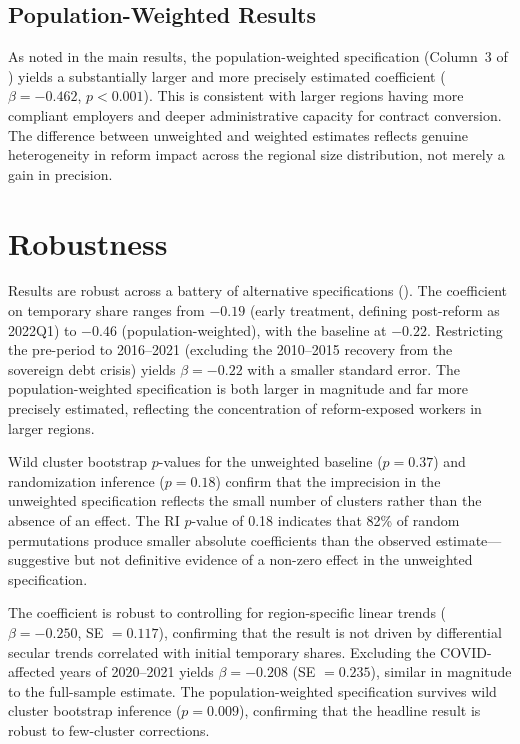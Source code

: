 \documentclass[12pt]{article}
\begin{document}
\subsection{Population-Weighted Results}

As noted in the main results, the population-weighted specification (Column~3 of ) yields a substantially larger and more precisely estimated coefficient ($\beta = -0.462$, $p < 0.001$). This is consistent with larger regions having more compliant employers and deeper administrative capacity for contract conversion. The difference between unweighted and weighted estimates reflects genuine heterogeneity in reform impact across the regional size distribution, not merely a gain in precision.


\section{Robustness}
\label{sec:robustness}

Results are robust across a battery of alternative specifications (). The coefficient on temporary share ranges from $-0.19$ (early treatment, defining post-reform as 2022Q1) to $-0.46$ (population-weighted), with the baseline at $-0.22$. Restricting the pre-period to 2016--2021 (excluding the 2010--2015 recovery from the sovereign debt crisis) yields $\beta = -0.22$ with a smaller standard error. The population-weighted specification is both larger in magnitude and far more precisely estimated, reflecting the concentration of reform-exposed workers in larger regions.

Wild cluster bootstrap $p$-values for the unweighted baseline ($p = 0.37$) and randomization inference ($p = 0.18$) confirm that the imprecision in the unweighted specification reflects the small number of clusters rather than the absence of an effect. The RI $p$-value of 0.18 indicates that 82\% of random permutations produce smaller absolute coefficients than the observed estimate---suggestive but not definitive evidence of a non-zero effect in the unweighted specification.

The coefficient is robust to controlling for region-specific linear trends ($\beta = -0.250$, SE $= 0.117$), confirming that the result is not driven by differential secular trends correlated with initial temporary shares. Excluding the COVID-affected years of 2020--2021 yields $\beta = -0.208$ (SE $= 0.235$), similar in magnitude to the full-sample estimate. The population-weighted specification survives wild cluster bootstrap inference ($p = 0.009$), confirming that the headline result is robust to few-cluster corrections.
\end{document}
